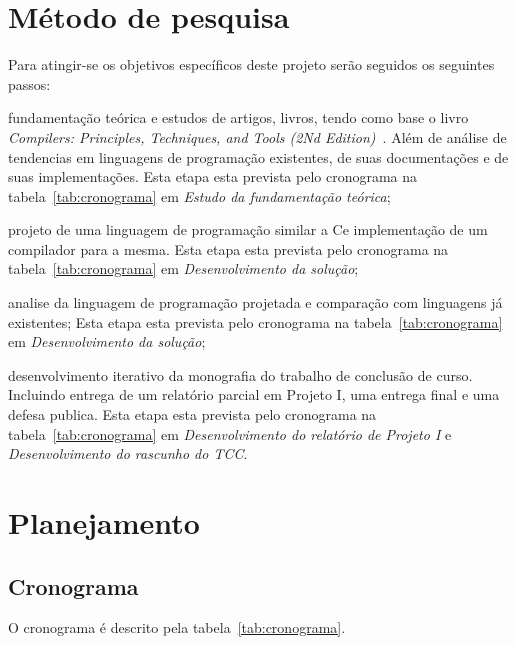 \documentclass[
  12pt,
  openright,
  twoside,
  a4paper,
  english,
  brazil
]{abntex2}
\begin{document}
\chapter{Método de pesquisa}\label{cap:metodo_de_pesquisa}

Para atingir-se os objetivos específicos deste projeto serão seguidos os seguintes passos:
\begin{alineas}
  \item fundamentação teórica e estudos de artigos, livros, tendo como base o livro \textit{Compilers: Principles, Techniques, and Tools (2Nd Edition)}~\cite{Aho:2006:CPT:1177220}.
    Além de análise de tendencias em linguagens de programação existentes, de suas documentações e de suas implementações.
    Esta etapa esta prevista pelo cronograma na tabela~\ref{tab:cronograma} em \textit{Estudo da fundamentação teórica};
  \item projeto de uma linguagem de programação similar a C\@ e implementação de um compilador para a mesma.
    Esta etapa esta prevista pelo cronograma na tabela~\ref{tab:cronograma} em \textit{Desenvolvimento da solução};
  \item analise da linguagem de programação projetada e comparação com linguagens já existentes;
    Esta etapa esta prevista pelo cronograma na tabela~\ref{tab:cronograma} em \textit{Desenvolvimento da solução};
  \item desenvolvimento iterativo da monografia do trabalho de conclusão de curso.
    Incluindo entrega de um relatório parcial em Projeto I, uma entrega final e uma defesa publica.
    Esta etapa esta prevista pelo cronograma na tabela~\ref{tab:cronograma} em \textit{Desenvolvimento do relatório de Projeto I} e \textit{Desenvolvimento do rascunho do TCC}.
\end{alineas}

\chapter{Planejamento}

\section{Cronograma}\label{cap:cronograma}

O cronograma é descrito pela tabela~\ref{tab:cronograma}.
\end{document}
